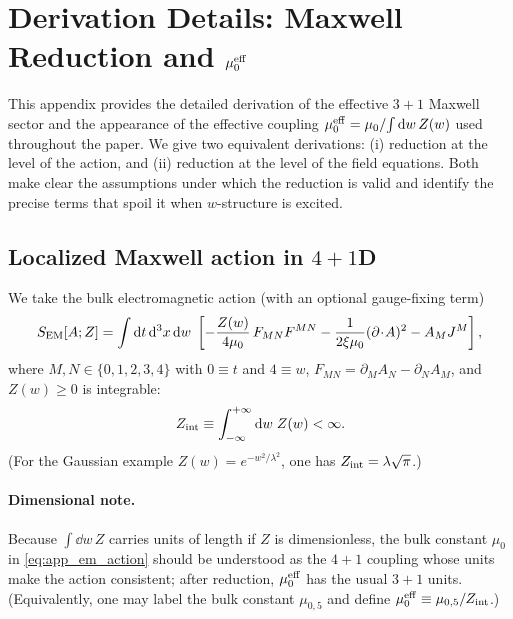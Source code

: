 \documentclass[11pt]{article}
\begin{document}
\section{Derivation Details: Maxwell Reduction and \texorpdfstring{$\mu_0^{\rm eff}$}{mu0eff}}
\label{app:maxwell_reduction}

This appendix provides the detailed derivation of the effective \(3+1\) Maxwell sector
and the appearance of the effective coupling
\(\mu_0^{\rm eff}=\mu_0/\!\int \dd w\,Z(w)\) used throughout the paper.
We give two equivalent derivations:
(i) reduction at the level of the action, and
(ii) reduction at the level of the field equations.
Both make clear the assumptions under which the reduction is valid and identify
the precise terms that spoil it when \(w\)-structure is excited.

\subsection{Localized Maxwell action in \(4+1\)D}
\label{app:maxwell_action}

We take the bulk electromagnetic action (with an optional gauge-fixing term)
\begin{equation}
S_{\rm EM}[A;Z]
=
\int \dd t\,\dd^3x\,\dd w\;
\left[
-\frac{Z(w)}{4\mu_0}\,F_{MN}F^{MN}
-\frac{1}{2\xi\mu_0}(\partial\!\cdot\!A)^2
- A_M J^M
\right],
\label{eq:app_em_action}
\end{equation}
where \(M,N\in\{0,1,2,3,4\}\) with \(0\equiv t\) and \(4\equiv w\),
\(F_{MN}=\partial_M A_N-\partial_N A_M\), and \(Z(w)\ge 0\) is integrable:
\begin{equation}
Z_{\rm int}\equiv \int_{-\infty}^{+\infty}\dd w\;Z(w) < \infty.
\label{eq:app_Zint}
\end{equation}
(For the Gaussian example \(Z(w)=e^{-w^2/\lambda^2}\), one has \(Z_{\rm int}=\lambda\sqrt{\pi}\).)

\paragraph{Dimensional note.}
Because \(\int \dd w\,Z\) carries units of length if \(Z\) is dimensionless, the bulk
constant \(\mu_0\) in \eqref{eq:app_em_action} should be understood as the \(4+1\) coupling
whose units make the action consistent; after reduction, \(\mu_0^{\rm eff}\) has the usual
\(3+1\) units. (Equivalently, one may label the bulk constant \(\mu_{0,5}\) and define
\(\mu_0^{\rm eff}\equiv \mu_{0,5}/Z_{\rm int}\).)
\end{document}
